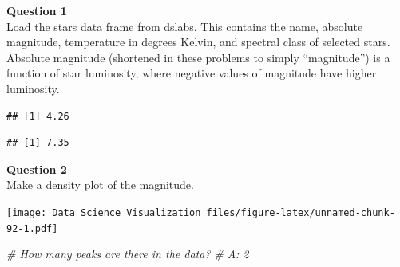 \documentclass[
]{article}
\newenvironment{Shaded}{\begin{snugshade}}{\end{snugshade}}
\newcommand{\CommentTok}[1]{\textcolor[rgb]{0.56,0.35,0.01}{\textit{#1}}}
\newcommand{\KeywordTok}[1]{\textcolor[rgb]{0.13,0.29,0.53}{\textbf{#1}}}
\newcommand{\NormalTok}[1]{#1}
\newcommand{\OperatorTok}[1]{\textcolor[rgb]{0.81,0.36,0.00}{\textbf{#1}}}
\newcommand{\StringTok}[1]{\textcolor[rgb]{0.31,0.60,0.02}{#1}}
\begin{document}
\textbf{Question 1}\\
Load the stars data frame from dslabs. This contains the name, absolute
magnitude, temperature in degrees Kelvin, and spectral class of selected
stars. Absolute magnitude (shortened in these problems to simply
``magnitude'') is a function of star luminosity, where negative values
of magnitude have higher luminosity.

\begin{Shaded}
\end{Shaded}

\begin{verbatim}
## [1] 4.26
\end{verbatim}

\begin{Shaded}
\end{Shaded}

\begin{verbatim}
## [1] 7.35
\end{verbatim}

\textbf{Question 2}\\
Make a density plot of the magnitude.

\begin{Shaded}
\end{Shaded}

\texttt{[image: Data\_Science\_Visualization\_files/figure-latex/unnamed-chunk-92-1.pdf]}

\begin{Shaded}
\begin{Highlighting}[]
\CommentTok{# How many peaks are there in the data?}
\CommentTok{# A: 2}
\end{Highlighting}
\end{Shaded}
\end{document}
